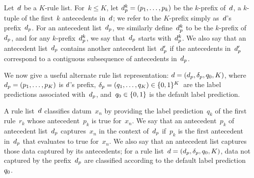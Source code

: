 Let~${d}$ be a $K$-rule list.
%
For~$k \le K$, let ${{d}_p^k = (p_1, \dots, p_k)}$ be the $k$-prefix of~${d}$,
a $k$-tuple of the first~$k$ antecedents in~${d}$;
we refer to the $K$-prefix simply as~${d}$'s prefix~$d_p$.
%
For an antecedent list~$d_p$, we similarly define~$d_p^k$
to be the $k$-prefix of~$d_p$, and for any $k$-prefix~$d_p^k$,
we say that~$d_p$ starts with~$d_p^k$.
%
We also say that an antecedent list~$d_p$ contains another
antecedent list~$d_p'$ if the antecedents in~$d_p'$ correspond to
a contiguous subsequence of antecedents in~$d_p$.

We now give a useful alternate rule list representation:
${{d} = (d_p, \delta_p, q_0, K)}$,
where ${d_p = (p_1, \dots, p_K)}$ is ${d}$'s prefix,
${\delta_p = (q_1, \dots, q_K) \in \{0, 1\}^K}$~are the label predictions associated
with~$d_p$, and~${q_0 \in \{0, 1\}}$ is the default label prediction.

A rule list~${d}$ classifies datum~$x_n$ by providing the label prediction~$q_k$
of the first rule~$r_k$ whose antecedent~$p_k$ is true for~$x_n$.
%
We say that an antecedent~$p_k$ of antecedent list~$d_p$ captures~$x_n$
in the context of~$d_p$ if~$p_k$ is the first antecedent in~$d_p$ that
evaluates to true for~$x_n$.
%
We also say that an antecedent list captures those data captured by its antecedents;
for a rule list~${{d} = (d_p, \delta_p, q_0, K)}$,
data not captured by the prefix~$d_p$
are classified according to the default label prediction~$q_0$.


